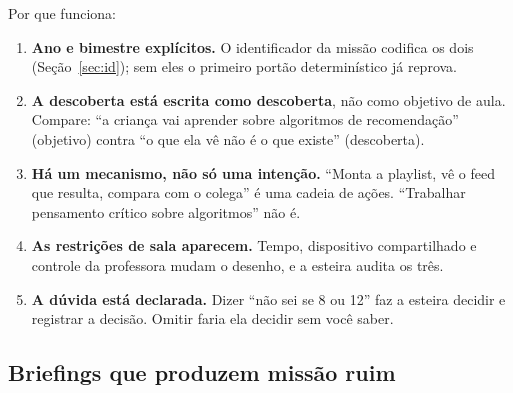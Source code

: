 \documentclass[11pt,a4paper]{article}
\begin{document}
\noindent
Por que funciona:

\begin{enumerate}[leftmargin=*,itemsep=2pt]
  \item \textbf{Ano e bimestre explícitos.} O identificador da missão codifica os dois
  (Seção~\ref{sec:id}); sem eles o primeiro portão determinístico já reprova.
  \item \textbf{A descoberta está escrita como descoberta}, não como objetivo de aula. Compare:
  ``a criança vai aprender sobre algoritmos de recomendação'' (objetivo) contra ``o que ela vê
  não é o que existe'' (descoberta).
  \item \textbf{Há um mecanismo, não só uma intenção.} ``Monta a playlist, vê o feed que
  resulta, compara com o colega'' é uma cadeia de ações. ``Trabalhar pensamento crítico sobre
  algoritmos'' não é.
  \item \textbf{As restrições de sala aparecem.} Tempo, dispositivo compartilhado e controle
  da professora mudam o desenho, e a esteira audita os três.
  \item \textbf{A dúvida está declarada.} Dizer ``não sei se 8 ou 12'' faz a esteira decidir e
  registrar a decisão. Omitir faria ela decidir sem você saber.
\end{enumerate}

\subsection{Briefings que produzem missão ruim}
\end{document}
